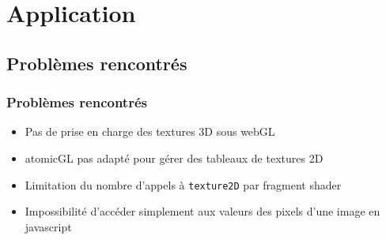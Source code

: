 \documentclass{beamer}
\begin{document}
\section{Application}
\subsection{Problèmes rencontrés}
\begin{frame}
    \frametitle{Problèmes rencontrés}
    \begin{itemize}
        \item Pas de prise en charge des textures 3D sous webGL
        \item atomicGL pas adapté pour gérer des tableaux de textures 2D
        \item Limitation du nombre d'appels à \texttt{texture2D} par fragment shader
        \item Impossibilité d'accéder simplement aux valeurs des pixels d'une image en javascript
    \end{itemize}
\end{frame}
\end{document}
